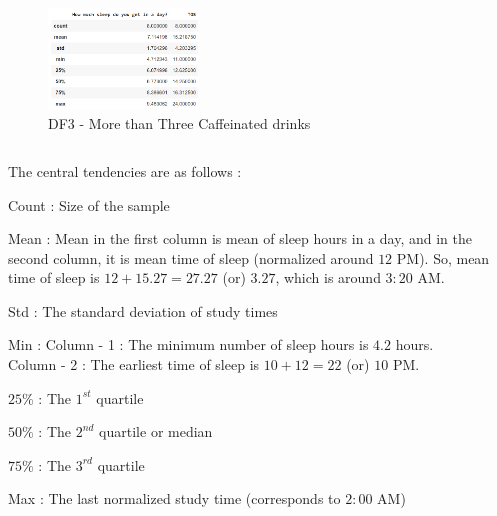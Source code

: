 \documentclass[11pt,]{beamer}
\begin{document}
\begin{frame}
\begin{columns}[c]
    	\begin{column}{.5\textwidth}
    	\begin{figure}
    		\includegraphics[width=4cm]{DF3.png}
    		\caption{\tiny{DF3 - More than Three Caffeinated drinks}}
    	\end{figure}
    	\end{column}
    	
    \end{columns}

\end{frame}

\begin{frame}
    The central tendencies are as follows : 
    
    \begin{block}
    
    Count : Size of the sample
    
    \smallskip
    
    Mean : Mean in the first column is mean of sleep hours in a day, and in the second column, it is mean time of sleep (normalized around $12$ PM). So, mean time of sleep is $12 + 15.27 = 27.27$ (or) $3.27$, which is around $3:20$ AM. 
    
    \smallskip
    
    Std : The standard deviation of study times 
    
    \smallskip
    
    Min : Column - 1 : The minimum number of sleep hours is $4.2$ hours. \\
          \hspace{9mm} Column - 2 : The earliest time of sleep is $10+ 12 = 22$ (or) $10$ PM. 
    
    \smallskip
    
    $25\%$ : The $1^{st}$ quartile
    
    \smallskip
    
    $50\%$ : The $2^{nd}$ quartile or median
    
    \smallskip
    
    $75\%$ : The $3^{rd}$ quartile 
    
    \smallskip
    
    Max : The last normalized study time (corresponds to $2:00$ AM) 
    
    \end{block}
\end{frame}
\end{document}
